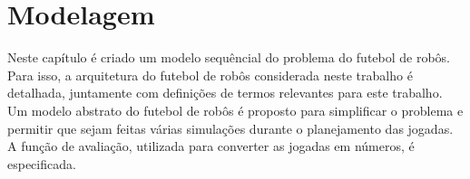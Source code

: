 \section{Modelagem}\label{cap:modelagem}

Neste capítulo é criado um modelo sequêncial do problema do futebol de robôs. 
Para isso, a arquitetura do futebol de robôs considerada neste trabalho é
detalhada, juntamente com definições de termos relevantes para este trabalho.
Um modelo abstrato do futebol de robôs é proposto para simplificar o problema
e permitir que sejam feitas várias simulações durante o planejamento das
jogadas. A função de avaliação, utilizada para converter as jogadas em números,
é especificada.




\subsection{}


